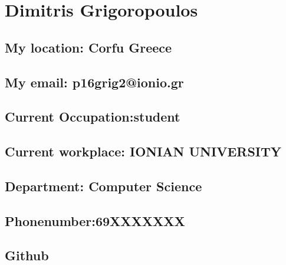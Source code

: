\hypertarget{dimitris-grigoropoulos}{%
\section{Dimitris Grigoropoulos}\label{dimitris-grigoropoulos}}

\hypertarget{my-location-corfu-greece}{%
\subsection{My location: Corfu Greece}\label{my-location-corfu-greece}}

\hypertarget{my-email-p16grig2ionio.gr}{%
\subsection{My email:
p16grig2@ionio.gr}\label{my-email-p16grig2ionio.gr}}

\hypertarget{current-occupationstudent}{%
\subsection{Current
Occupation:student}\label{current-occupationstudent}}

\hypertarget{current-workplace-ionian-university}{%
\subsection{Current workplace: IONIAN
UNIVERSITY}\label{current-workplace-ionian-university}}

\hypertarget{department-computer-science}{%
\subsection{Department: Computer
Science}\label{department-computer-science}}

\hypertarget{phonenumber69xxxxxxx}{%
\subsection{Phonenumber:69XXXXXXX}\label{phonenumber69xxxxxxx}}

\hypertarget{github}{%
\subsection{Github}\label{github}}

